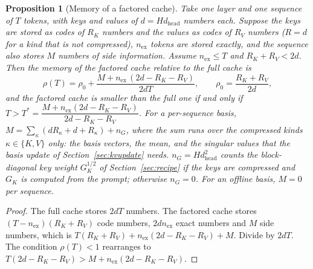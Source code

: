 \documentclass[10pt]{article}
\theoremstyle{plain}
\newtheorem{proposition}[theorem]{Proposition}
\theoremstyle{definition}
\theoremstyle{remark}
\newcommand{\dhead}{d_{\mathrm{head}}}
\begin{document}
\begin{proposition}[Memory of a factored cache]\label{prop:kvmem}
Take one layer and one sequence of $T$ tokens, with keys and values of $d=H\dhead$ numbers each. Suppose the keys are stored as codes of $R_K$ numbers and the values as codes of $R_V$ numbers ($R=d$ for a kind that is not compressed), $n_{\mathrm{ex}}$ tokens are stored exactly, and the sequence also stores $M$ numbers of side information. Assume $n_{\mathrm{ex}}\le T$ and $R_K+R_V<2d$. Then the memory of the factored cache relative to the full cache is
\[
\rho(T)=\rho_0+\frac{M+n_{\mathrm{ex}}\,(2d-R_K-R_V)}{2dT},\qquad \rho_0=\frac{R_K+R_V}{2d},
\]
and the factored cache is smaller than the full one if and only if $T>T^\ast=\dfrac{M+n_{\mathrm{ex}}(2d-R_K-R_V)}{2d-R_K-R_V}$. For a per-sequence basis, $M=\sum_{\kappa}(dR_\kappa+d+R_\kappa)+n_G$, where the sum runs over the \emph{compressed} kinds $\kappa\in\{K,V\}$ only: the basis vectors, the mean, and the singular values that the basis update of Section~\ref{sec:kvupdate} needs. $n_G=H\dhead^2$ counts the block-diagonal key weight $G_K^{1/2}$ of Section~\ref{sec:recipe} if the keys are compressed and $G_K$ is computed from the prompt; otherwise $n_G=0$. For an offline basis, $M=0$ per sequence.
\end{proposition}
\begin{proof}
The full cache stores $2dT$ numbers. The factored cache stores $(T-n_{\mathrm{ex}})(R_K+R_V)$ code numbers, $2dn_{\mathrm{ex}}$ exact numbers and $M$ side numbers, which is $T(R_K+R_V)+n_{\mathrm{ex}}(2d-R_K-R_V)+M$. Divide by $2dT$. The condition $\rho(T)<1$ rearranges to $T(2d-R_K-R_V)>M+n_{\mathrm{ex}}(2d-R_K-R_V)$.
\end{proof}
\end{document}
